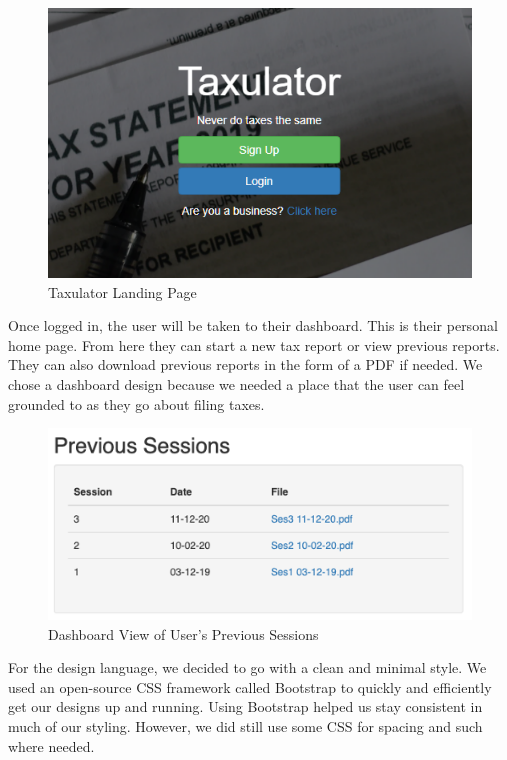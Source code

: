 \documentclass[sigconf]{acmart}
\begin{document}
\begin{figure}[H]
 \label{Home}
  \centering
  \includegraphics[width=\linewidth]{Images/TaxulatorHome2.png}
  \caption{Taxulator Landing Page}
\end{figure}

Once logged in, the user will be taken to their dashboard. This is their personal home page. From here they can start a new tax report or view previous reports. They can also download previous reports in the form of a PDF if needed. We chose a dashboard design because we needed a place that the user can feel grounded to as they go about filing taxes.

\begin{figure}[H]
  \label{Dashboard}
  \centering
  \includegraphics[width=\linewidth]{Images/Dashboard.png}
  \caption{Dashboard View of User’s Previous Sessions}
\end{figure}

For the design language, we decided to go with a clean and minimal style. We used an open-source CSS framework called Bootstrap \cite{Bootstrap} to quickly and efficiently get our designs up and running. Using Bootstrap helped us stay consistent in much of our styling. However, we did still use some CSS for spacing and such where needed.
\end{document}
